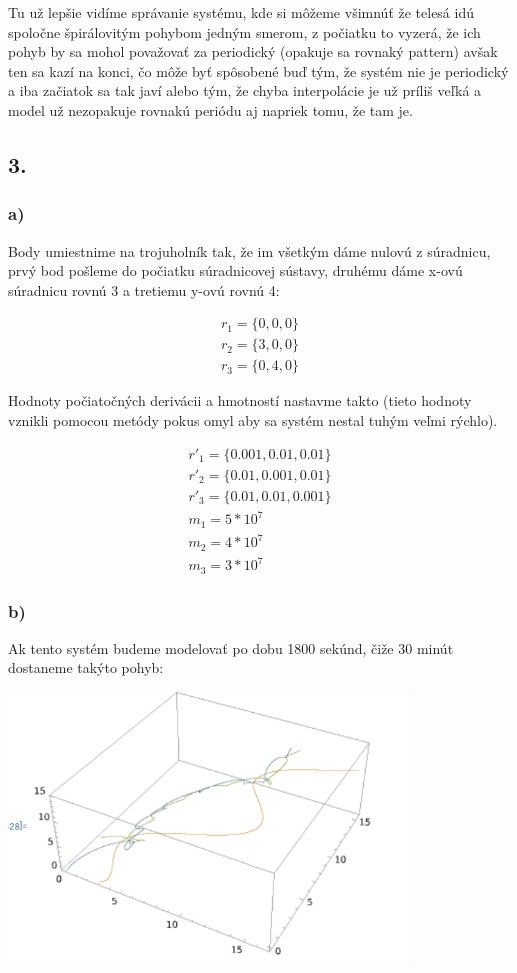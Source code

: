 \documentclass[a4paper]{article}
\begin{document}
	 Tu už lepšie vidíme správanie systému, kde si môžeme všimnúť že telesá idú spoločne špirálovitým pohybom jedným smerom, z počiatku to vyzerá, že ich pohyb by sa mohol považovať za periodický (opakuje sa rovnaký pattern) avšak ten sa kazí na konci, čo môže byť spôsobené buď tým, že systém nie je periodický a iba začiatok sa tak javí alebo tým, že chyba interpolácie je už príliš veľká a model už nezopakuje rovnakú periódu aj napriek tomu, že tam je. 
	
	\subsection{3.}
	
	\subsubsection{a)}
	
	Body umiestnime na trojuholník tak, že im všetkým dáme nulovú z súradnicu, prvý bod pošleme do počiatku súradnicovej sústavy, druhému dáme x-ovú súradnicu rovnú 3 a tretiemu y-ovú rovnú 4:
	
	\begin{align*}
		r_1=\{0,0,0\}\\
		r_2=\{3,0,0\}\\
		r_3=\{0,4,0\}
	\end{align*}
	
	Hodnoty počiatočných derivácii a hmotností nastavme takto (tieto hodnoty vznikli pomocou metódy pokus omyl aby sa systém nestal tuhým veľmi rýchlo).
	
	\begin{align*}
		r'_1=\{0.001,0.01,0.01\}\\
		r'_2=\{0.01,0.001,0.01\}\\
		r'_3=\{0.01,0.01,0.001\}\\
		m_1=5*10^7\\
		m_2=4*10^7\\
		m_3=3*10^7
	\end{align*}
	
	\subsubsection{b)}
	
	Ak tento systém budeme modelovať po dobu 1800 sekúnd, čiže 30 minút dostaneme takýto pohyb:
	
	\centerline{\includegraphics[width=0.8\textwidth]{pohyb_3}}
	
\end{document}
